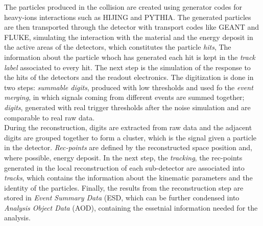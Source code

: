 The particles produced in the collision are created using generator codes for heavy-ions interactions such as HIJING and PYTHIA. The generated particles are  then transported through the detector with transport codes like GEANT and FLUKE, simulating the interaction with the material and the energy deposit in the active areas of the detectors, which constitutes the particle \textit{hits}, The information about the particle whoch has generated each hit is kept in the \textit{track label} associated to every hit. The next step is the simulation of the response to the hits of the detectors and the readout electronics. The digitization is done in two steps: \textit{summable digits}, produced with low thresholds and used fo the \textit{event merging}, in which signals coming from different events are summed together; \textit{digits}, generated with real trigger thresholds after the noise simulation and are comparable to real raw data.\\
During the reconstruction, digits are extracted from raw data and the adjacent digits are grouped together to form  a cluster, which is the signal given a particle in the detector. \textit{Rec-points} are defined by the reconstructed space position and, where possible, energy deposit. In the next step, the \textit{tracking}, the rec-points generated in the local reconstruction of each sub-detector are associated into \textit{tracks}, which contains the information about the kinematic parameters and the identity of the particles. Finally, the results from the reconstruction step are stored in \textit{Event Summary Data} (ESD, which can be further condensed into \textit{Analysis Object Data} (AOD), containing the essetnial information needed for the analysis.